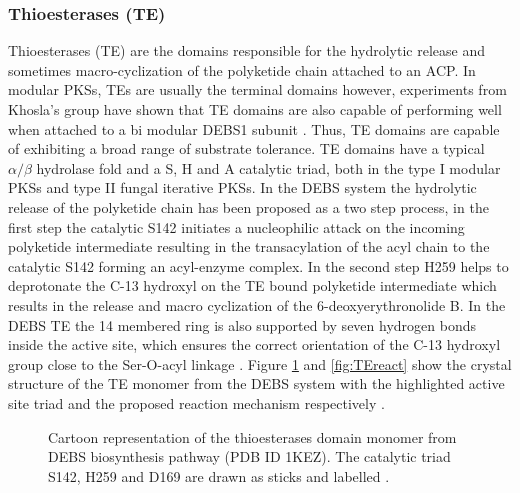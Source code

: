 			\subsubsection{Thioesterases (TE)}
			\label{sec:TE}
			Thioesterases (TE) are the domains responsible for the hydrolytic release and sometimes macro-cyclization  of the polyketide chain attached to an ACP. In modular PKSs, TEs are usually the terminal domains however, experiments from Khosla's group have shown that TE domains are also capable of performing well when attached to a bi modular DEBS1 subunit \parencite{Gokhale1999a}. Thus, TE domains are capable of exhibiting a broad range of substrate tolerance. TE domains have a typical $ \alpha/\beta $ hydrolase fold and a S, H and A catalytic triad, both in the type I modular PKSs and type II fungal iterative PKSs. In the DEBS system the hydrolytic release of the polyketide chain has been proposed as a two step process, in the first step the catalytic S142 initiates a nucleophilic attack on the incoming polyketide intermediate resulting in the transacylation of the acyl chain to the catalytic S142 forming an acyl-enzyme complex. In the second step H259 helps to deprotonate the C-13 hydroxyl on the TE bound polyketide intermediate which results in the release and macro cyclization of the 6-deoxyerythronolide B. In the DEBS TE the 14 membered ring is also supported by seven hydrogen bonds inside the active site, which ensures the correct orientation of the C-13 hydroxyl group close to the Ser-O-acyl linkage  \parencite{Gokhale1999a, Sharma2007, Khosla2007}. Figure \ref{fig:TE} and \ref{fig:TEreact} show the crystal structure of the TE monomer from the DEBS system with the highlighted active site triad and the proposed reaction mechanism respectively \parencite{Tsai2001}. 

			\setlength\fboxsep{5pt}
 			\setlength\fboxrule{1.5pt}
			\begin{figure} []
			\centering
			\caption[Cartoon representation of the thioesterases domain from DEBS biosynthesis pathway]{Cartoon representation of the thioesterases domain monomer from DEBS biosynthesis pathway (PDB ID 1KEZ). The catalytic triad S142, H259 and D169 are drawn as sticks and labelled \parencite{Tsai2001}. }
			\label{fig:TE}
			\end{figure}
			
